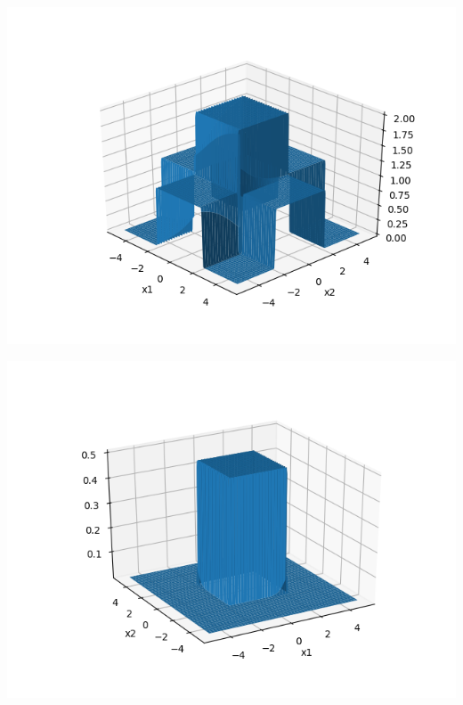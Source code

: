 \documentclass[solution,addpoints,12pt]{exam}
\begin{document}
\begin{questions}
\begin{parts}
\begin{solution}
                  		\begin{center}
                  			\includegraphics[scale=0.8]{h_31}
                  			\label{fig:h31}
                  		\end{center}
                  		
                  		\begin{center}
                  			\includegraphics[scale=0.8]{f}
                  			\label{fig:f}
                  		\end{center}
                  \end{solution}
           \end{parts}
    

           
\end{questions}
\end{document}
